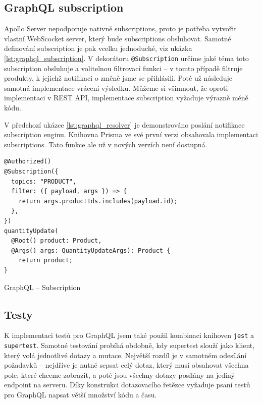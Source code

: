 \documentclass[thesis=M,czech]{FITthesis}[2019/12/23]
\begin{document}
\subsection{GraphQL subscription}
Apollo Server nepodporuje nativně subscriptions, proto je potřeba vytvořit vlastní WebScocket server, který bude subscriptions obsluhovat. Samotné definování subscription je pak vcelku jednoduché, viz ukázka \ref{lst:graphql_subscription}. V dekorátoru \texttt{@Subscription} určíme jaké téma toto subscription obsluhuje a volitelnou filtrovací funkci -- v tomto případě filtruje produkty, k jejichž notifikaci o změně jsme se přihlásili. Poté už následuje samotná implementace vrácení výsledku. Můžeme si všimnout, že oproti implementaci v REST API, implementace subscription vyžaduje výrazně méně kódu.

V předchozí ukázce \ref{lst:graphql_resolver} je demonstrováno poslání notifikace subscription enginu. Knihovna Prisma ve své první verzi obsahovala implementaci subscriptions. Tato funkce ale už v nových verzích není dostupná.

\begin{listing}[H]
\begin{verbatim}
@Authorized()
@Subscription({
  topics: "PRODUCT",
  filter: ({ payload, args }) => {
    return args.productIds.includes(payload.id);
  },
})
quantityUpdate(
  @Root() product: Product,
  @Args() args: QuantityUpdateArgs): Product {
    return product;
}
\end{verbatim}
\caption{GraphQL -- Subscription}
\label{lst:graphql_subscription}
\end{listing}

\subsection{Testy}
K implementaci testů pro GraphQL jsem také použil kombinaci knihoven \texttt{jest} a \texttt{supertest}. Samotné testování probíhá obdobně, kdy supertest slouží jako klient, který volá jednotlivé dotazy a mutace. Největší rozdíl je v samotném odesílání požadavků -- nejdříve je nutné sepsat celý dotaz, který musí obsahovat všechna pole, které chceme zobrazit, a poté jsou všechny dotazy posílány na jediný endpoint na serveru. Díky konstrukci dotazovacího řetězce vyžaduje psaní testů pro GraphQL napsat větší množství kódu a času.
\end{document}
